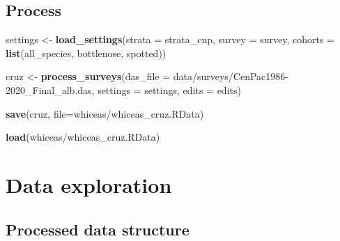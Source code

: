 \documentclass[
]{book}
\newenvironment{Shaded}{\begin{snugshade}}{\end{snugshade}}
\newcommand{\AttributeTok}[1]{\textcolor[rgb]{0.13,0.29,0.53}{#1}}
\newcommand{\FunctionTok}[1]{\textcolor[rgb]{0.13,0.29,0.53}{\textbf{#1}}}
\newcommand{\NormalTok}[1]{#1}
\newcommand{\OtherTok}[1]{\textcolor[rgb]{0.56,0.35,0.01}{#1}}
\newcommand{\StringTok}[1]{\textcolor[rgb]{0.31,0.60,0.02}{#1}}
\begin{document}
\hypertarget{process}{%
\subsection*{Process}\label{process}}

\begin{Shaded}
\begin{Highlighting}[]
\NormalTok{settings }\OtherTok{\textless{}{-}} \FunctionTok{load\_settings}\NormalTok{(}\AttributeTok{strata =}\NormalTok{ strata\_cnp,}
                          \AttributeTok{survey =}\NormalTok{ survey,}
                          \AttributeTok{cohorts =} \FunctionTok{list}\NormalTok{(all\_species,}
\NormalTok{                                         bottlenose,}
\NormalTok{                                         spotted))}

\NormalTok{cruz }\OtherTok{\textless{}{-}} 
  \FunctionTok{process\_surveys}\NormalTok{(}\AttributeTok{das\_file =} \StringTok{\textquotesingle{}data/surveys/CenPac1986{-}2020\_Final\_alb.das\textquotesingle{}}\NormalTok{,}
                  \AttributeTok{settings =}\NormalTok{ settings,}
                  \AttributeTok{edits =}\NormalTok{ edits) }

\FunctionTok{save}\NormalTok{(cruz, }\AttributeTok{file=}\StringTok{\textquotesingle{}whiceas/whiceas\_cruz.RData\textquotesingle{}}\NormalTok{)}
\end{Highlighting}
\end{Shaded}

\begin{Shaded}
\begin{Highlighting}[]
\FunctionTok{load}\NormalTok{(}\StringTok{\textquotesingle{}whiceas/whiceas\_cruz.RData\textquotesingle{}}\NormalTok{)}
\end{Highlighting}
\end{Shaded}

\hypertarget{data-exploration}{%
\section*{Data exploration}\label{data-exploration}}

\hypertarget{processed-data-structure}{%
\subsection*{Processed data structure}\label{processed-data-structure}}
\end{document}
